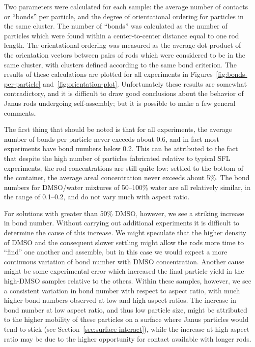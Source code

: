 Two parameters were calculated for each sample: the average number of contacts or ``bonds''
per particle, and the degree of orientational ordering for particles in the same cluster.
The number of ``bonds'' was calculated as the number of particles which were found within a 
center-to-center distance equal to one rod length.  The orientational ordering was measured
as the average dot-product of the orientation vectors between pairs of rods which were 
considered to be in the same cluster, with clusters defined according to the same bond criterion.
The results of these calculations are plotted for all experiments in Figures~\ref{fig:bonds-per-particle}
and~\ref{fig:orientation-plot}.  Unfortunately these results are somewhat contradictory, and it 
is difficult to draw good conclusions about the behavior of Janus rods undergoing self-assembly;
but it is possible to make a few general comments.

The first thing that should be noted is that for all experiments, the average number of bonds per
particle never exceeds about 0.6, and in fact most experiments have bond numbers below 0.2.  This
can be attributed to the fact that despite the high number of particles fabricated relative to
typical SFL experiments, the rod concentrations are still quite low: settled to the bottom of the
container, the average areal concentration never exceeds about 5\%.  The bond numbers for 
DMSO/water mixtures of 50--100\% water are all relatively similar, in the range of 0.1--0.2, and do
not vary much with aspect ratio.  

For solutions with greater than 
50\% DMSO, however, we see a striking increase in bond number.  Without carrying out additional experiments it 
is difficult to determine the cause of this increase. We might speculate that the higher density of DMSO
and the consequent slower settling might allow the rods more time to ``find'' one another and assemble, but in
this case we would expect a more continuous variation of bond number with DMSO concentration. Another cause might
be some experimental error which increased the final particle yield in the high-DMSO samples relative to the others.
Within these samples, however, we see a consistent variation in bond number with respect to aspect ratio, with
much higher bond numbers observed at low and high aspect ratios.  The increase in bond number at low aspect ratio, 
and thus low particle size, might be attributed to the higher mobility of these particles on a surface where
Janus particles would tend to stick (see Section~\ref{sec:surface-interact}), while the increase at high aspect
ratio may be due to the higher opportunity for contact available with longer rods.

